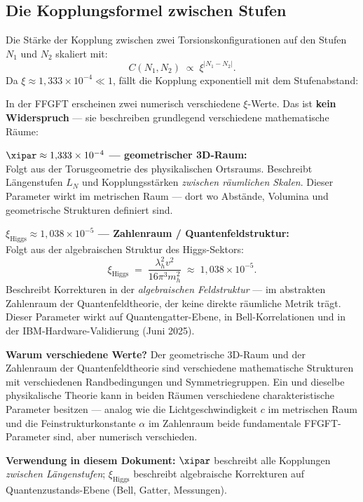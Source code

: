 \subsection{Die Kopplungsformel zwischen Stufen}

Die Stärke der Kopplung zwischen zwei Torsions\-konfigurationen
auf den Stufen $N_1$ und $N_2$ skaliert mit:
\begin{equation}
  \boxed{C(N_1, N_2) \;\propto\; \xi^{|N_1 - N_2|}.}
\end{equation}
Da $\xi \approx 1{,}333 \times 10^{-4} \ll 1$,
fällt die Kopplung exponentiell mit dem Stufenabstand:

\begin{keypoint}
In der FFGFT erscheinen zwei numerisch verschiedene $\xi$-Werte.
Das ist \textbf{kein Widerspruch} --- sie beschreiben
grundlegend verschiedene mathematische Räume:

\textbf{$\xipar \approx 1{,}333 \times 10^{-4}$ --- geometrischer 3D-Raum:}\\
Folgt aus der Torusgeometrie des physikalischen Ortsraums.
Beschreibt Längenstufen $L_N$ und Kopplungsstärken
\emph{zwischen räumlichen Skalen}.
Dieser Parameter wirkt im metrischen Raum ---
dort wo Abstände, Volumina und geometrische Strukturen definiert sind.

\textbf{$\xi_\text{Higgs} \approx 1{,}038 \times 10^{-5}$ --- Zahlenraum / Quantenfeldstruktur:}\\
Folgt aus der algebraischen Struktur des Higgs-Sektors:
\[
  \xi_\text{Higgs} \;=\; \frac{\lambda_h^2 v^2}{16\pi^3 m_h^2}
  \;\approx\; 1{,}038 \times 10^{-5}.
\]
Beschreibt Korrekturen in der \emph{algebraischen Feldstruktur} ---
im abstrakten Zahlenraum der Quantenfeldtheorie,
der keine direkte räumliche Metrik trägt.
Dieser Parameter wirkt auf Quantengatter-Ebene, in Bell-Korrelationen
und in der IBM-Hardware-Validierung (Juni 2025).

\textbf{Warum verschiedene Werte?}
Der geometrische 3D-Raum und der Zahlenraum der Quantenfeldtheorie
sind verschiedene mathematische Strukturen mit verschiedenen
Randbedingungen und Symmetriegruppen.
Ein und dieselbe physikalische Theorie kann in beiden Räumen
verschiedene charakteristische Parameter besitzen ---
analog wie die Lichtgeschwindigkeit $c$ im metrischen Raum
und die Feinstrukturkonstante $\alpha$ im Zahlenraum
beide fundamentale FFGFT-Parameter sind, aber numerisch verschieden.

\textbf{Verwendung in diesem Dokument:}
$\xipar$ beschreibt alle Kopplungen \emph{zwischen Längenstufen};
$\xi_\text{Higgs}$ beschreibt algebraische Korrekturen
auf Quantenzustands-Ebene (Bell, Gatter, Messungen).
\end{keypoint}

